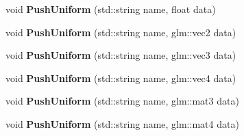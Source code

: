 \begin{DoxyCompactItemize}
\item 
void {\bfseries Push\+Uniform} (std\+::string name, float data)\hypertarget{class_shader_ad583e175e1aa3ddca27b5e03b2023b47}{}\label{class_shader_ad583e175e1aa3ddca27b5e03b2023b47}

\item 
void {\bfseries Push\+Uniform} (std\+::string name, glm\+::vec2 data)\hypertarget{class_shader_a1eb1c429312a75ae01544a19a14b8c09}{}\label{class_shader_a1eb1c429312a75ae01544a19a14b8c09}

\item 
void {\bfseries Push\+Uniform} (std\+::string name, glm\+::vec3 data)\hypertarget{class_shader_a1233367cea31d94899069d0fe9fd70cb}{}\label{class_shader_a1233367cea31d94899069d0fe9fd70cb}

\item 
void {\bfseries Push\+Uniform} (std\+::string name, glm\+::vec4 data)\hypertarget{class_shader_a1d2e5734ca8cd5926ada84c9cfdef8c1}{}\label{class_shader_a1d2e5734ca8cd5926ada84c9cfdef8c1}

\item 
void {\bfseries Push\+Uniform} (std\+::string name, glm\+::mat3 data)\hypertarget{class_shader_a171d69ff2f635fdb1b44878fab6d93c2}{}\label{class_shader_a171d69ff2f635fdb1b44878fab6d93c2}

\item 
void {\bfseries Push\+Uniform} (std\+::string name, glm\+::mat4 data)\hypertarget{class_shader_a220e5175bab4710aa14aafb142179633}{}\label{class_shader_a220e5175bab4710aa14aafb142179633}

\end{DoxyCompactItemize}
